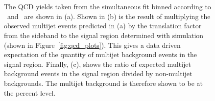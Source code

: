 \begin{figure}[!h]
  \centering
   ~
   \\
   \\
  \caption{
    The QCD yields taken from the simultaneous fit binned according to \njet~and \scalht~are shown in (a).
    Shown in (b) is the result of multiplying the observed multijet events predicted
    in (a) by the translation factor from the sideband to the signal
    region determined with simulation (shown in
    Figure~\ref{fig:qcd_plots}). This gives a data driven expectation of
    the quantity of multijet background events in the signal region. 
    Finally, (c), shows the ratio of expected
    multijet background events in the signal region divided by
    non-multijet backgrounds. The multijet background is therefore
    shown to be at the percent level.}
  \label{fig:qcd_plots2}
\end{figure}

